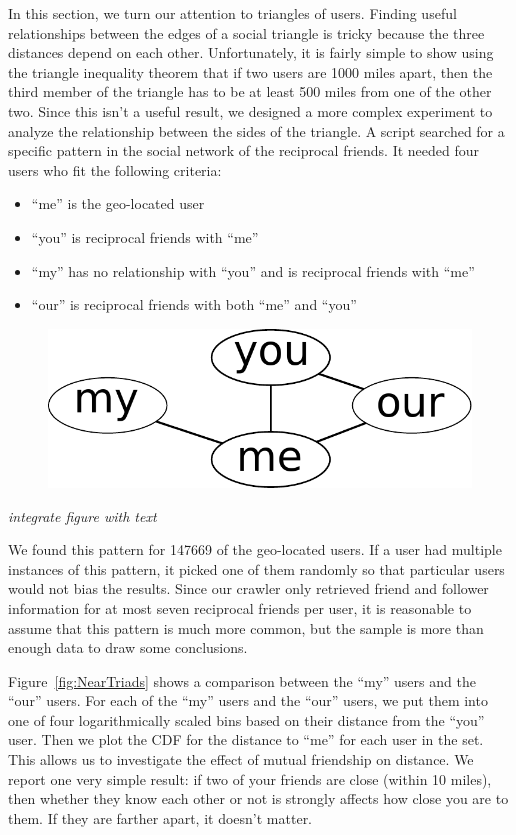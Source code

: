 In this section, we turn our attention to triangles of users.
Finding useful relationships between the edges of a social triangle is tricky
because the three distances depend on each other.
Unfortunately, it is fairly simple to show using the triangle inequality theorem
that if two users are 1000 miles apart, then the third member of the triangle
has to be at least 500 miles from one of the other two.
Since this isn't a useful result, we designed a more complex experiment to
analyze the relationship between the sides of the triangle.
A script searched for a specific pattern in the social network of the
reciprocal friends.  It needed four users who fit the following criteria:
\begin{itemize}
\item ``me'' is the geo-located user
\item ``you'' is reciprocal friends with ``me''
\item ``my'' has no relationship with ``you'' and is reciprocal friends with ``me''
\item ``our'' is reciprocal friends with both ``me'' and ``you''
\end{itemize}

\begin{figure}[h!]
\centering
\includegraphics[width=0.4\linewidth]{figures/near_triads_dia.pdf}
\label{fig:NearTriadsDia}
\end{figure}

\emph{integrate figure with text}

We found this pattern for 147669 of the geo-located users.
If a user had multiple instances of this pattern, it picked one of them
randomly so that particular users would not bias the results.
Since our crawler only retrieved friend and follower information for at most
seven reciprocal friends per user, it is reasonable to assume that this pattern
is much more common, but the sample is more than enough data to draw some
conclusions.

Figure~\ref{fig:NearTriads} shows a comparison between the ``my'' users and the
``our'' users.
For each of the ``my'' users and the ``our'' users, we put them into one of
four logarithmically scaled bins based on their distance from the ``you'' user.
Then we plot the CDF for the distance to ``me'' for each user in the set. This
allows us to investigate the effect of mutual friendship on distance.
We report one very simple result: if two of your friends are close (within 10
miles), then whether they know each other or not is strongly affects how close
you are to them. If they are farther apart, it doesn't matter.

